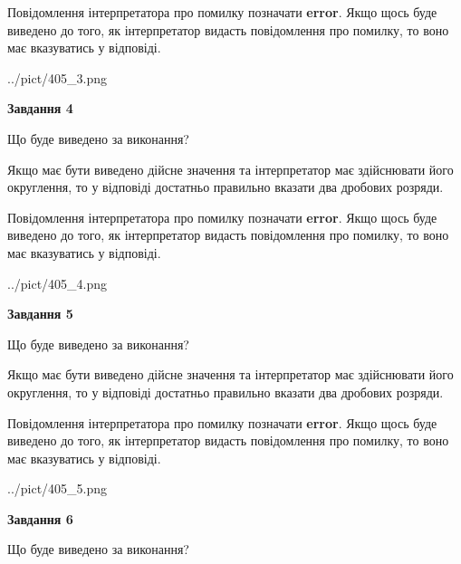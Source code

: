 \documentclass[12pt, ukrainian]{article}
\begin{document}
{\begin {Large}
Повідомлення інтерпретатора про помилку позначати \textbf{error}.
Якщо щось буде виведено до того, як інтерпретатор видасть повідомлення про помилку, 
то воно має вказуватись у відповіді. \par

\begin{center}
	{../pict/405_3.png}
\end{center}
\newpage

{\begin {center}\textbf{Завдання 4}\end {center}}\par
Що буде виведено за виконання? \par

Якщо має бути виведено дійсне значення та інтерпретатор має здійснювати його округлення, 
то у відповіді достатньо правильно вказати два дробових розряди.

Повідомлення інтерпретатора про помилку позначати \textbf{error}.
Якщо щось буде виведено до того, як інтерпретатор видасть повідомлення про помилку, 
то воно має вказуватись у відповіді. \par

\begin{center}
	{../pict/405_4.png}
\end{center}
\newpage

{\begin {center}\textbf{Завдання 5}\end {center}}\par
Що буде виведено за виконання? \par

Якщо має бути виведено дійсне значення та інтерпретатор має здійснювати його округлення, 
то у відповіді достатньо правильно вказати два дробових розряди.

Повідомлення інтерпретатора про помилку позначати \textbf{error}.
Якщо щось буде виведено до того, як інтерпретатор видасть повідомлення про помилку, 
то воно має вказуватись у відповіді. \par

\begin{center}
	{../pict/405_5.png}
\end{center}
\newpage

{\begin {center}\textbf{Завдання 6}\end {center}}\par
Що буде виведено за виконання? \par


\end{Large}}
\end{document}
